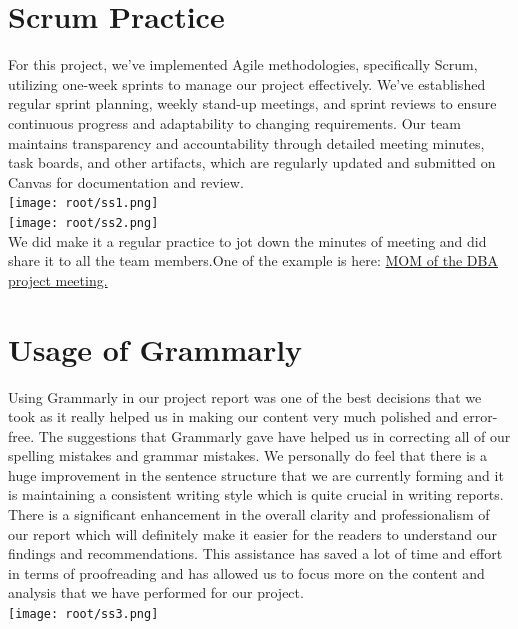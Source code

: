\section{\Large\textbf{Scrum Practice}}
{For this project, we've implemented Agile methodologies, specifically Scrum, utilizing one-week sprints to manage our project effectively. We've established regular sprint planning, weekly stand-up meetings, and sprint reviews to ensure continuous progress and adaptability to changing requirements. Our team maintains transparency and accountability through detailed meeting minutes, task boards, and other artifacts, which are regularly updated and submitted on Canvas for documentation and review. 
}\\
\vspace{2cm}
\texttt{[image: root/ss1.png]}~\\
\texttt{[image: root/ss2.png]}~\\
{We did make it a regular practice to jot down the minutes of meeting and did share it to all the team members.One of the example is here:}
\href{https://docs.google.com/document/d/1qKK7A6k3jXr8TkXPlfGVerHoZhj3we9W/edit?usp=drive_link&ouid=117701647846204913682&rtpof=true&sd=true
}{MOM of the DBA project meeting.}


\section{\Large\textbf{Usage of Grammarly}}
{Using Grammarly in our project report was one of the best decisions that we took as it really helped us in making our content very much polished and error-free. The suggestions  that 	Grammarly gave have helped us in correcting all of our spelling mistakes and grammar mistakes. We personally do feel that there is a huge improvement in the sentence structure that we are currently forming and it is maintaining a consistent writing style which is quite crucial in writing reports. There is a significant enhancement in the overall clarity and professionalism of our report which will definitely make it easier for the readers to understand our findings and recommendations. This assistance has saved a lot of time and effort in terms of proofreading and has allowed us to focus more on the content and analysis that we have performed for our project.
}\\
\vspace{2cm}
\texttt{[image: root/ss3.png]}~\\
\vspace{2cm}

